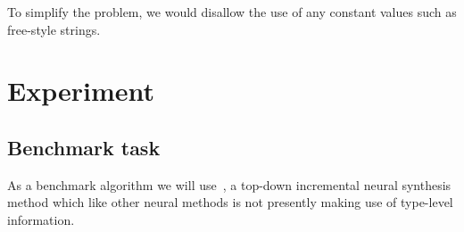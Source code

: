 \documentclass{article}
\begin{document}
To simplify the problem, we would disallow the use of any constant values such as free-style strings.

\section{Experiment}

\subsection{Benchmark task}


As a benchmark algorithm we will use~\cite{nsps}, a top-down incremental neural synthesis method which like other neural methods is not presently making use of type-level information.

\end{document}
